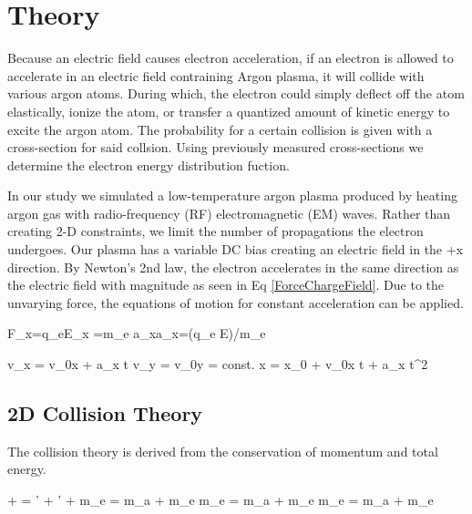 \documentclass[12pt]{article}
\begin{document}
\section{Theory}
Because an electric field causes electron acceleration, if an electron is allowed to 
accelerate in an electric field contraining Argon plasma, it will collide with 
various argon atoms. During which, the electron could simply deflect off the atom 
elastically, ionize the atom, or transfer a quantized amount of kinetic energy to 
excite the argon atom. The probability for a certain collision is given with a cross-section for said collsion. 
Using previously measured cross-sections we determine the  electron energy distribution fuction.

In our study we simulated a low-temperature argon plasma produced by heating argon gas with 
radio-frequency (RF) electromagnetic (EM) waves. 
Rather than creating 2-D constraints,
 we limit the number of propagations the electron undergoes.
Our plasma has a variable DC bias creating an electric field in the +x direction.
By Newton’s 2nd law, the electron accelerates in the 
same direction as the electric field with magnitude
as seen in Eq \ref{ForceChargeField}. Due to the unvarying force,
the equations of motion for constant acceleration can be applied. 

\beqn
F_{x}=q_{e}E_{x} =m_{e} a_x\rightarrow a_x=(q_{e} E)/m_{e}
\label{ForceChargeField}
\eeqn
\vspace{-1.2 cm}

\beqn
v_x = v_{0x} + a_x t
\label{Initial VelocityX}
\eeqn
\vspace{-0.8 cm}
\beqn
v_y = v_{0y} = const. 
\label{Initial VelocityY}
\eeqn
\vspace{-0.8 cm}
\beqn
x = x_0 + v_{0x} t +  a_x t^2
\label{Initial Position}
\eeqn






\subsection{2D Collision Theory}
The collision theory is derived from the conservation of momentum and total energy.

\beqn
{} +  = ' +  ' + 
\label{conserve momentum p}
\eeqn
\vspace{-0.8 cm}
\beqn
m_e  = m_a  + m_e 
\label{initial final momentum mv}
\eeqn
\vspace{-0.8 cm}
\beqn
m_e  = m_a  + m_e 
\label{initial final momentum mv 2dx}
\eeqn
\vspace{-0.8 cm}
\beqn
m_e  = m_a  + m_e 
\label{initial final momentum mv 2dy}
\eeqn
\end{document}
